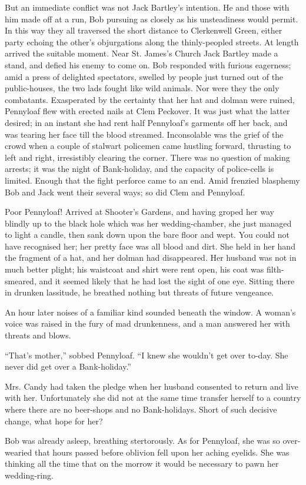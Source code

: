 But an immediate conflict was not Jack Bartley's intention. He and those
with him made off at a run, Bob pursuing as closely as his unsteadiness
would permit. In this way they all traversed the short distance to
Clerkenwell Green, either party echoing the other's objurgations along
the thinly-peopled streets. At length arrived the suitable moment. Near
St. James's Church Jack Bartley made a stand, and defied his enemy to
come on. Bob responded with furious eagerness; amid a press of delighted
spectators, swelled by people just turned out of the public-houses, the
two lads {}fought like wild animals. Nor were they the only combatants.
Exasperated by the certainty that her hat and dolman were ruined,
Pennyloaf flew with erected nails at Clem Peckover. It was just what the
latter desired; in an instant she had rent half Pennyloaf's garments off
her back, and was tearing her face till the blood streamed. Inconsolable
was the grief of the crowd when a couple of stalwart policemen came
hustling forward, thrusting to left and right, irresistibly clearing the
corner. There was no question of making arrests; it was the night of
Bank-holiday, and the capacity of police-cells is limited. Enough that
the fight perforce came to an end. Amid frenzied blasphemy Bob and Jack
went their several ways; so did Clem and Pennyloaf.

Poor Pennyloaf! Arrived at Shooter's Gardens, and having groped her way
blindly up to the black hole which was her wedding-chamber, she just
managed to light a candle, then sank down upon the bare floor and wept.
You could not have recognised her; her pretty face was all blood and
dirt. She held in her {}hand the fragment of a hat, and her dolman had
disappeared. Her husband was not in much better plight; his waistcoat
and shirt were rent open, his coat was filth-smeared, and it seemed
likely that he had lost the sight of one eye. Sitting there in drunken
lassitude, he breathed nothing but threats of future vengeance.

An hour later noises of a familiar kind sounded beneath the window. A
woman's voice was raised in the fury of mad drunkenness, and a man
answered her with threats and blows.

``That's mother,'' sobbed Pennyloaf. ``I knew she wouldn't get over
to-day. She never did get over a Bank-holiday.''

Mrs. Candy had taken the pledge when her husband consented to return and
live with her. Unfortunately she did not at the same time transfer
herself to a country where there are no beer-shops and no Bank-holidays.
Short of such decisive change, what hope for her?

Bob was already asleep, breathing {}stertorously. As for Pennyloaf, she
was so over-wearied that hours passed before oblivion fell upon her
aching eyelids. She was thinking all the time that on the morrow it
would be necessary to pawn her wedding-ring.
